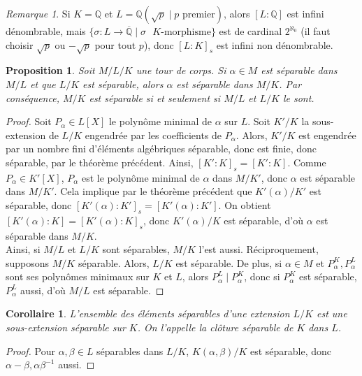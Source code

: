 \documentclass{article}
\newcommand{\Q}{\mathbb{Q}}
\newcommand{\Qbar}{\overline{\mathbb{Q}}}
\theoremstyle{plain}
\newtheorem{proposition}[theorem]{Proposition}
\newtheorem{corollary}[theorem]{Corollaire}
\theoremstyle{definition}
\theoremstyle{remark}
\newtheorem*{remark}{Remarque}
\begin{document}
\begin{remark}
    Si $K = \Q$ et $L = \Q(\sqrt{p} \mid p \text{ premier})$, alors $[L : \Q]$ est infini dénombrable, mais $\{\sigma : L \to \Qbar \mid \sigma\text{ $K$-morphisme}\}$ est de cardinal $2^{\aleph_0}$ (il faut choisir $\sqrt{p}$ ou $-\sqrt{p}$ pour tout $p$), donc $[L : K]_s$ est infini non dénombrable.
\end{remark}

\begin{proposition}
    Soit $M/L/K$ une tour de corps. Si $\alpha \in M$ est séparable dans $M/L$ et que $L/K$ est séparable, alors $\alpha$ est séparable dans $M/K$. Par conséquence, $M/K$ est séparable si et seulement si $M/L$ et $L/K$ le sont.
\end{proposition}

\begin{proof}
    Soit $P_\alpha \in L[X]$ le polynôme minimal de $\alpha$ sur $L$. Soit $K'/K$ la sous-extension de $L/K$ engendrée par les coefficients de $P_\alpha$. Alors, $K'/K$ est engendrée par un nombre fini d'éléments  algébriques séparable, donc est finie, donc séparable, par le théorème précédent. Ainsi, $[K' : K]_s = [K' : K]$. Comme $P_\alpha \in K'[X]$, $P_\alpha$ est le polynôme minimal de $\alpha$ dans $M/K'$, donc $\alpha$ est séparable dans $M/K'$. Cela implique par le théorème précédent que $K'(\alpha)/K'$ est séparable, donc $[K'(\alpha) : K']_s = [K'(\alpha) : K']$. On obtient $[K'(\alpha) : K] = [K'(\alpha) : K]_s$, donc $K'(\alpha)/K$ est séparable, d'où $\alpha$ est séparable dans $M/K$. \\
    Ainsi, si $M/L$ et $L/K$ sont séparables, $M/K$ l'est aussi. Réciproquement, supposons $M/K$ séparable. Alors, $L/K$ est séparable. De plus, si $\alpha \in M$ et $P_\alpha^K, P_\alpha^L$ sont ses polynômes minimaux sur $K$ et $L$, alors $P_\alpha^L \mid P_\alpha^K$, donc si $P_\alpha^K$ est séparable, $P_\alpha^L$ aussi, d'où $M/L$ est séparable.
\end{proof}

\begin{corollary}
    L'ensemble des éléments séparables d'une extension $L/K$ est une sous-extension séparable sur $K$. On l'appelle la \emph{clôture séparable de $K$ dans $L$}.
\end{corollary}

\begin{proof}
    Pour $\alpha,\beta \in L$ séparables dans $L/K$, $K(\alpha,\beta)/K$ est séparable, donc $\alpha - \beta, \alpha \beta^{-1}$ aussi.
\end{proof}
\end{document}
